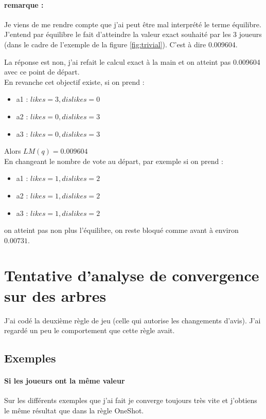 \documentclass[12pt]{article}
\theoremstyle{defi}
\theoremstyle{not}
\theoremstyle{prob}
\begin{document}
      \paragraph{remarque :}
        Je viens de me rendre compte que j'ai peut être mal interprété le terme équilibre.
        J'entend par équilibre le fait d'atteindre la valeur exact souhaité par les 3 joueurs (dans le cadre de l'exemple de la figure \ref{fig:trivial}).
        C'est à dire 0.009604.

        La réponse est non, j'ai refait le calcul exact à la main et on atteint pas 0.009604 avec ce point de départ.\\

    En revanche cet objectif existe, si on prend :
    \begin{itemize}
      \item a1 : $likes = 3, dislikes = 0$
      \item a2 : $likes = 0, dislikes = 3$
      \item a3 : $likes = 0, dislikes = 3$
    \end{itemize}

    Alors $LM(q) = 0.009604$\\

    En changeant le nombre de vote au départ, par exemple si on prend :
    \begin{itemize}
      \item a1 : $likes = 1, dislikes = 2$
      \item a2 : $likes = 1, dislikes = 2$
      \item a3 : $likes = 1, dislikes = 2$
    \end{itemize}

    on atteint pas non plus l'équilibre, on reste bloqué comme avant à environ $0.00731$.

  \section{Tentative d'analyse de convergence sur des arbres}
    J'ai codé la deuxième règle de jeu (celle qui autorise les changements d'avis). J'ai regardé un peu le comportement que cette règle avait.

    \subsection{Exemples}
      \paragraph{Si les joueurs ont la même valeur}
        Sur les différents exemples que j'ai fait je converge toujours très vite et j'obtiens le même résultat que dans la règle OneShot.
\end{document}
